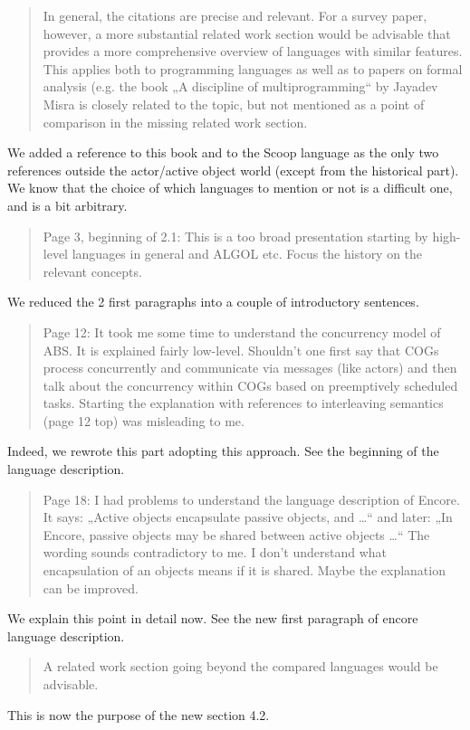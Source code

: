 \documentclass{article}
\begin{document}
\begin{quote}
	In general, the citations are precise and relevant. For a survey paper, however, a 
	more 
substantial related work section would be advisable that provides a more comprehensive 
overview of languages with similar features. This applies both to programming languages 
as well as to papers on formal analysis (e.g. the book „A discipline of multiprogramming“ 
by Jayadev Misra is closely related to the topic, but not mentioned as a point of 
comparison in the missing related work section. 
\end{quote}
We added a reference to this book and to the Scoop language as the only two references 
outside the actor/active object world (except from the historical part). We know that the 
choice of which languages to mention or not is a difficult one, and is a bit arbitrary.

\begin{quote}
 Page 3, beginning of 2.1: This is a too broad presentation starting by high-level 
languages in general and ALGOL etc. Focus the history on the relevant concepts.
\end{quote}
We reduced the 2 first paragraphs into a couple of introductory sentences.


\begin{quote}
Page 12: It took me some time to understand the concurrency model of ABS. It is 
explained fairly low-level. Shouldn’t one first say that COGs process concurrently and 
communicate via messages (like actors) and then talk about the concurrency within COGs 
based on preemptively scheduled tasks. Starting the explanation with references to 
interleaving semantics (page 12 top) was misleading to me. 
\end{quote}
Indeed, we rewrote this part adopting this approach. See the beginning of the language 
description.

\begin{quote} Page 18: I had problems to understand the language description of Encore. 
It says: 
„Active objects encapsulate passive objects, and …“ and later: „In Encore, passive 
objects may be shared between active objects …“ The wording sounds contradictory to me. I 
don’t understand what encapsulation of an objects means if it is shared. Maybe the 
explanation can be improved.
\end{quote}
We explain this point in detail now.
See the new first paragraph of encore language description.


\begin{quote}
 A related work section going beyond the compared languages would be advisable.
\end{quote}
This is now the purpose of the new section 4.2.
\end{document}
